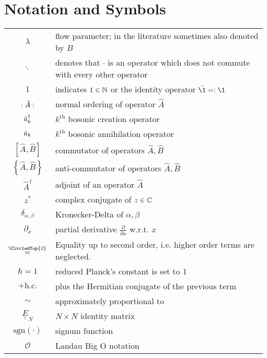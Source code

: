 \chapter*{Notation and Symbols}
\begin{tabular}{cp{}}
  $\lambda$ & flow parameter; in the literature sometimes also denoted by $B$ \\
  $\hat\cdot$ & denotes that $\cdot$ is an operator which does not commute with every other operator\\
  $1$ & indicates $1\in\mathbb{N}$ or the identity operator $\hat{\1}\eqdef \1$\\
  $\vcentcolon \hat A\vcentcolon$ & normal ordering of operator $\hat A$\\ 
  $\hat a^\dagger_k$ & $k^\mathrm{th}$ bosonic creation operator \\
  $\hat a_k$ & $k^\mathrm{th}$ bosonic annihilation operator \\
  $[\hat{ A},\hat{ B}]$ & commutator of operators $\hat{ A},\hat{ B}$ \\
  $\left\{\hat{ A},\hat{ B}\right\}$ & anti-commutator of operators $\hat{ A},\hat{ B}$ \\
  $\hat A^\dagger$ & adjoint of an operator $\hat{ A}$ \\
  $z^*$ & complex conjugate of $z\in\mathbb{C}$ \\
  $\delta_{\alpha,\beta}$ & Kronecker-Delta of $\alpha,\beta$ \\ 
  $\partial_x$ & partial derivative $\frac{\partial}{\partial x}$ w.r.t. $x$\\
  $\overset{\CircledTop{2}}{=}$ & Equality up to second order, i.e. higher order terms are neglected.\\
  $\hbar=1$ & reduced Planck's constant is set to $1$\\
  $+\mathrm{h.c.}$ & plus the Hermitian conjugate of the previous term\\
  $\sim$ & approximately proportional to\\
  $\underline{\underline E}_N$ & $N\times N$ identity matrix\\
  $\mathrm{sgn}\left(\cdot\right)$ & signum function\\
  $\mathcal O$ & Landau Big O notation
\end{tabular}\\







